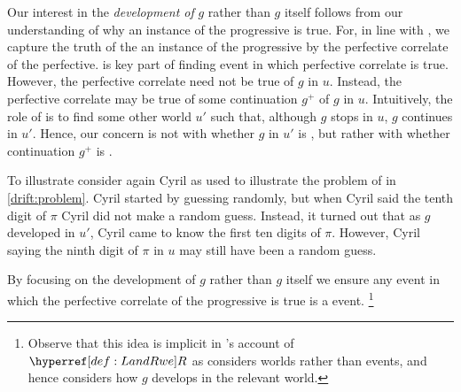 \begin{note}[Development]
  Our interest in the \emph{development of} \(g\) rather than \(g\) itself follows from our understanding of why an instance of the progressive is true.
  For, in line with \assuPP{}, we capture the truth of the an instance of the progressive by the perfective correlate of the perfective.
  \AlgFindBranches{} is key part of finding event in which perfective correlate is true.
  However, the perfective correlate need not be true of \(g\) in \(u\).
  Instead, the perfective correlate may be true of some continuation \(g^{+}\) of \(g\) in \(u\).
  Intuitively, the role of \AlgFindBranches{} is to find some other world \(u'\) such that, although \(g\) stops in \(u\), \(g\) continues in \(u'\).
  Hence, our concern is not with whether \(g\) in \(u'\) is \drAdj{}, but rather with whether continuation \(g^{+}\) is \drAdj{}.

  To illustrate consider again Cyril as used to illustrate the problem of \ndrAdj{}  in \autoref{drift:problem}.
  Cyril started by guessing randomly, but when Cyril said the tenth digit of \(\pi\) Cyril did not make a random guess.
  Instead, it turned out that as \(g\) developed in \(u'\), Cyril came to know the first ten digits of \(\pi\).
  However, Cyril saying the ninth digit of \(\pi\) in \(u\) may still have been a random guess.

  By focusing on the development of \(g\) rather than \(g\) itself we ensure any event in which the perfective correlate of the progressive is true is a \drAdj{} event.%
  \footnote{
    Observe that this idea is implicit in \citeauthor{Landman:1992wh}'s account of \(\lRweSym{}\) as \citeauthor{Landman:1992wh} considers worlds rather than events, and hence considers how \(g\) develops in the relevant world.
  }
\end{note}

